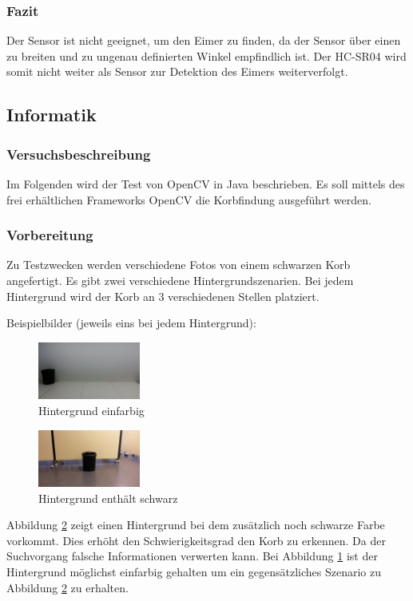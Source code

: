 \subsubsection{Fazit}
Der Sensor ist nicht geeignet, um den Eimer zu finden, da der Sensor über 
einen zu breiten und zu ungenau definierten Winkel empfindlich ist. Der 
HC-SR04 wird somit nicht weiter als Sensor zur Detektion des Eimers 
weiterverfolgt. 

\subsection{Informatik}

\subsubsection{Versuchsbeschreibung}
Im Folgenden wird der Test von OpenCV in Java beschrieben. Es soll mittels des frei erhältlichen Frameworks OpenCV die Korbfindung ausgeführt werden.

\subsubsection{Vorbereitung}
Zu Testzwecken werden verschiedene Fotos von einem schwarzen Korb angefertigt. Es gibt zwei verschiedene Hintergrundszenarien. Bei jedem Hintergrund wird der Korb an 3 verschiedenen Stellen platziert.

Beispielbilder (jeweils eins bei jedem Hintergrund):

\begin{figure}[h!]
	\centering
	\includegraphics[width=0.3\textwidth]{fig/korb4.jpg}
	\caption{Hintergrund einfarbig}
	\label{fig:Korb_HEinfarbig}
\end{figure}

\begin{figure}[h!]
	\centering
	\includegraphics[width=0.3\textwidth]{fig/korb1.jpg}
	\caption{Hintergrund enthält schwarz}
	\label{fig:Korb_HSchwarz}
\end{figure}
Abbildung \ref{fig:Korb_HSchwarz} zeigt einen Hintergrund bei dem zusätzlich noch schwarze Farbe vorkommt. Dies erhöht den Schwierigkeitsgrad  den Korb zu erkennen. Da der Suchvorgang falsche Informationen verwerten kann. Bei Abbildung \ref{fig:Korb_HEinfarbig} ist der Hintergrund möglichst einfarbig gehalten um ein gegensätzliches Szenario zu Abbildung \ref{fig:Korb_HSchwarz} zu erhalten.

